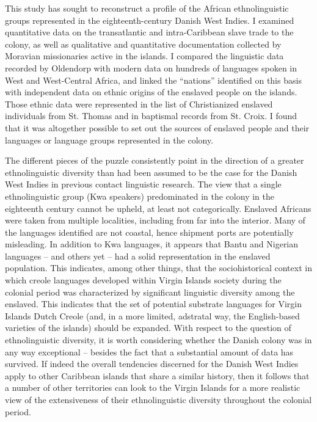 \documentclass[output=paper,colorlinks,citecolor=brown]{langscibook}
\begin{document}
This study has sought to reconstruct a profile of the African ethnolinguistic groups represented in the eighteenth-century Danish West Indies. I examined quantitative data on the transatlantic and intra-Caribbean slave trade to the colony, as well as qualitative and quantitative documentation collected by Moravian missionaries active in the islands. I compared the linguistic data recorded by Oldendorp with modern data on hundreds of languages spoken in West and West-Central Africa, and linked the “nations” identified on this basis with independent data on ethnic origins of the enslaved people on the islands. Those ethnic data were represented in the list of Christianized enslaved individuals from St. Thomas and in baptismal records from St. Croix. I found that it was altogether possible to set out the sources of enslaved people and their languages or language groups represented in the colony.

The different pieces of the puzzle consistently point in the direction of a greater ethnolinguistic diversity than had been assumed to be the case for the Danish West Indies in previous contact linguistic research. The view that a single ethnolinguistic group (Kwa speakers) predominated in the colony in the eighteenth century cannot be upheld, at least not categorically. Enslaved Africans were taken from multiple localities, including from far into the interior. Many of the languages identified are not coastal, hence shipment ports are potentially misleading. In addition to Kwa languages, it appears that Bantu and Nigerian languages – and others yet – had a solid representation in the enslaved population. This indicates, among other things, that the sociohistorical context in which creole languages developed within Virgin Islands society during the colonial period was characterized by significant linguistic diversity among the enslaved. This indicates that the set of potential substrate languages for Virgin Islands Dutch Creole (and, in a more limited, adstratal way, the English-based varieties of the islands) should be expanded. With respect to the question of ethnolinguistic diversity, it is worth considering whether the Danish colony was in any way exceptional – besides the fact that a substantial amount of data has survived. If indeed the overall tendencies discerned for the Danish West Indies apply to other Caribbean islands that share a similar history, then it follows that a number of other territories can look to the Virgin Islands for a more realistic view of the extensiveness of their ethnolinguistic diversity throughout the colonial period.
\end{document}
